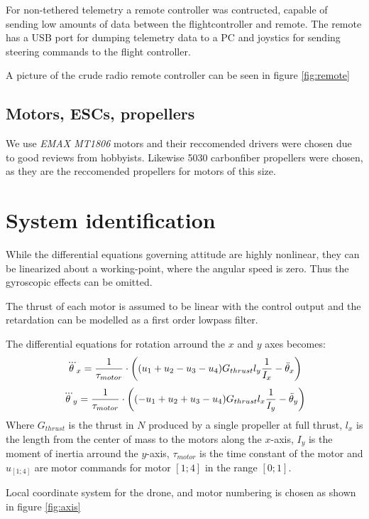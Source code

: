 For non-tethered telemetry a remote controller was contructed, capable of
sending low amounts of data between the flightcontroller and remote. The remote
has a USB port for dumping telemetry data to a PC and joystics for sending
steering commands to the flight controller.

A picture of the crude radio remote controller can be seen in figure
\ref{fig:remote}

\subsection{ Motors, ESCs, propellers }
We use \emph{EMAX MT1806} motors
and their reccomended drivers were chosen due to good reviews from
hobbyists. Likewise 5030 carbonfiber propellers were chosen, as they are the
reccomended propellers for motors of this size.

\section{ System identification } %
While the differential equations governing attitude are highly nonlinear,
they can be linearized about a working-point, where the angular speed is zero.
Thus the gyroscopic effects can be omitted.

The thrust of each motor is assumed to be linear with the control output and the
retardation can be modelled as a first order lowpass filter.

The differential equations for rotation arround the $x$ and $y$ axes
becomes:
\begin{equation}
 \dddot\theta_x = \frac{1}{\tau_{motor}} \cdot \left(
 (u_1 + u_2 - u_3 - u_4) G_{thrust} l_{y} \frac{ 1 }{ I_{x} }  - \ddot\theta_x
 \right) 
\end{equation}
\begin{equation}
 \dddot\theta_y = \frac{1}{\tau_{motor}} \cdot \left(
 (-u_1 + u_2 + u_3 - u_4) G_{thrust} l_{x} \frac{ 1 }{ I_{y} }  - \ddot\theta_y
 \right) 
\end{equation}
Where $G_{thrust}$ is the thrust in $N$ produced by a single propeller at full
thrust, $l_{x}$ is the length from the center of mass to the motors along the
$x$-axis, $I_{y}$ is the moment of inertia arround the $y$-axis,
$\tau_{motor}$ is the time constant of the motor and $u_{[1;4]}$ are motor
commands for motor $[1;4]$ in the range $[0;1]$.

Local coordinate system for the drone, and motor numbering is chosen as shown in
figure \ref{fig:axis}

